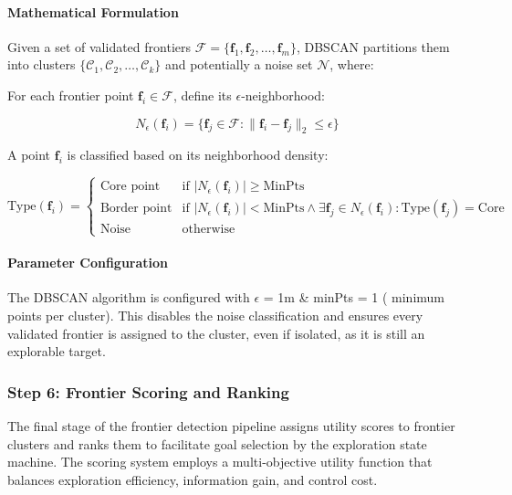 \documentclass[11pt]{article}
\begin{document}
\paragraph{Mathematical Formulation}

Given a set of validated frontiers $\mathcal{F} = \{\mathbf{f}_1, \mathbf{f}_2, \ldots, \mathbf{f}_m\}$, DBSCAN partitions them into clusters $\{\mathcal{C}_1, \mathcal{C}_2, \ldots, \mathcal{C}_k\}$ and potentially a noise set $\mathcal{N}$, where:

For each frontier point $\mathbf{f}_i \in \mathcal{F}$, define its $\epsilon$-neighborhood:

\begin{equation}
	N_\epsilon(\mathbf{f}_i) = \{\mathbf{f}_j \in \mathcal{F} : \|\mathbf{f}_i - \mathbf{f}_j\|_2 \leq \epsilon\}
\end{equation}

A point $\mathbf{f}_i$ is classified based on its neighborhood density:

\begin{equation}
	\text{Type}(\mathbf{f}_i) = \begin{cases}
		\text{Core point} & \text{if } |N_\epsilon(\mathbf{f}_i)| \geq \text{MinPts} \\
		\text{Border point} & \text{if } |N_\epsilon(\mathbf{f}_i)| < \text{MinPts} \land \exists \mathbf{f}_j \in N_\epsilon(\mathbf{f}_i) : \text{Type}(\mathbf{f}_j) = \text{Core} \\
		\text{Noise} & \text{otherwise}
	\end{cases}
\end{equation}

\paragraph{Parameter Configuration}

The DBSCAN algorithm is configured with $\epsilon$ = 1m \& minPts = 1 ( minimum points per cluster). This disables the noise classification and ensures every validated frontier is assigned to the cluster, even if isolated, as it is still an explorable target.

\subsubsection{Step 6: Frontier Scoring and Ranking}

The final stage of the frontier detection pipeline assigns utility scores to frontier clusters and ranks them to facilitate goal selection by the exploration state machine. The scoring system employs a multi-objective utility function that balances exploration efficiency, information gain, and control cost.
\end{document}
